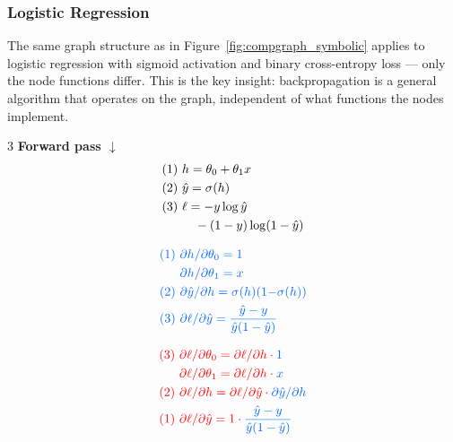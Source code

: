 \subsubsection{Logistic Regression}

The same graph structure as in Figure~\ref{fig:compgraph_symbolic} applies to logistic regression with sigmoid activation and binary cross-entropy loss --- only the node functions differ. This is the key insight: backpropagation is a general algorithm that operates on the graph, independent of what functions the nodes implement.

\begin{multicols}{3}
\noindent\textbf{Forward pass $\downarrow$}
\begin{align*}
(1)\ & h = \theta_0 + \theta_1 x\\
(2)\ & \hat{y} = \sigma(h)\\
(3)\ & \ell = -y\log\hat{y}\\
     & \quad - (1-y)\log(1-\hat{y})
\end{align*}

\columnbreak
{}
\begin{align*}
\color[HTML]{0066FF}(1)\ & \color[HTML]{0066FF}\partial h/\partial \theta_0 = 1\\
\color[HTML]{0066FF}     & \color[HTML]{0066FF}\partial h/\partial \theta_1 = x\\
\color[HTML]{0066FF}(2)\ & \color[HTML]{0066FF}\partial \yhat/\partial h = \sigma(h)(1{-}\sigma(h))\\
\color[HTML]{0066FF}(3)\ & \color[HTML]{0066FF}\partial \ell/\partial \yhat = \frac{\yhat - y}{\yhat(1-\yhat)}
\end{align*}

\columnbreak
{}
\begin{align*}
\color[HTML]{FF0000}(3)\ & \color[HTML]{FF0000}\partial \ell/\partial \theta_0 = {\color[HTML]{FF0000}\partial\ell/\partial h} \cdot {\color[HTML]{0066FF}1}\\
\color[HTML]{FF0000}     & \color[HTML]{FF0000}\partial \ell/\partial \theta_1 = {\color[HTML]{FF0000}\partial\ell/\partial h} \cdot {\color[HTML]{0066FF}x}\\
\color[HTML]{FF0000}(2)\ & \color[HTML]{FF0000}\partial \ell/\partial h = {\color[HTML]{FF0000}\partial\ell/\partial\yhat} \cdot {\color[HTML]{0066FF}\partial\yhat/\partial h}\\
\color[HTML]{FF0000}(1)\ & \color[HTML]{FF0000}\partial \ell/\partial \yhat = 1 \cdot {\color[HTML]{0066FF}\frac{\yhat-y}{\yhat(1-\yhat)}}
\end{align*}
\end{multicols}

